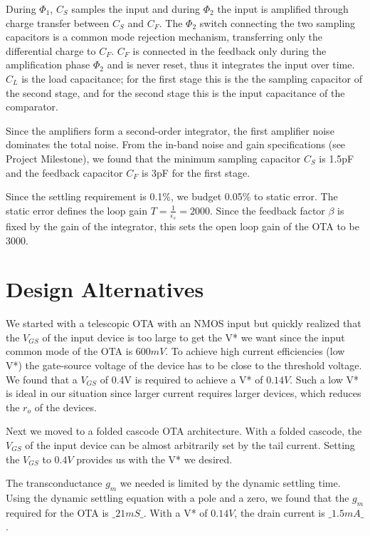 \documentclass[conference]{IEEEtran}
\begin{document}
During $\Phi_1$, $C_S$ samples the input and during $\Phi_2$ the input is amplified through charge transfer between $C_S$ and $C_F$. The $\Phi_2$ switch connecting the two sampling capacitors is a common mode rejection mechanism, transferring only the differential charge to $C_F$. $C_F$ is connected in the feedback only during the amplification phase $\Phi_2$ and is never reset, thus it integrates the input over time. $C_L$ is the load capacitance; for the first stage this is the the sampling capacitor of the second stage, and for the second stage this is the input capacitance of the comparator.

Since the amplifiers form a second-order integrator, the first amplifier noise dominates the total noise. From the in-band noise and gain specifications (see Project Milestone), we found that the minimum sampling capacitor $C_S$ is 1.5pF and the feedback capacitor $C_F$ is 3pF for the first stage. 

Since the settling requirement is 0.1\%, we budget 0.05\% to static error. The static error defines the loop gain $T = \frac{1}{\epsilon_s} = 2000$. Since the feedback factor $\beta$ is fixed by the gain of the integrator, this sets the open loop gain of the OTA to be $3000$.

\section{Design Alternatives}

We started with a telescopic OTA with an NMOS input but quickly realized that the $V_{GS}$ of the input device is too large to get the V* we want since the input common mode of the OTA is $600mV$. To achieve high current efficiencies (low V*) the gate-source voltage of the device has to be close to the threshold voltage. We found that a $V_{GS}$ of 0.4V is required to achieve a V* of $0.14V$. Such a low V* is ideal in our situation since larger current requires larger devices, which reduces the $r_o$ of the devices.

Next we moved to a folded cascode OTA architecture. With a folded cascode, the $V_{GS}$ of the input device can be almost arbitrarily set by the tail current. Setting the $V_{GS}$ to $0.4V$ provides us with the V* we desired. 

The transconductance $g_m$ we needed is limited by the dynamic settling time. Using the dynamic settling equation with a pole and a zero, we found that the $g_m$ required for the OTA is $\_21mS\_$. With a V* of $0.14V$, the drain current is $\_1.5mA\_$.
\end{document}
